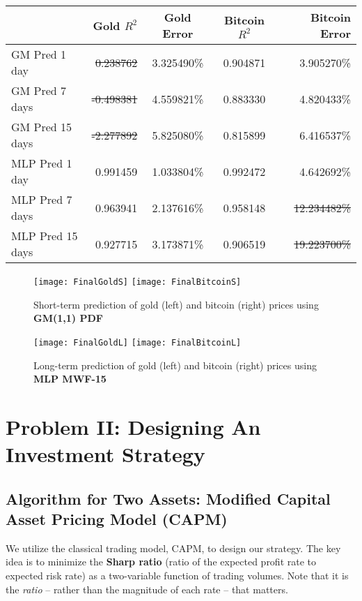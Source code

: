 \documentclass{mcmthesis}
\begin{document}
{	\begin{center}
		\begin{tabular}{l|rccr}
			\toprule
			& Gold $R^2$ & Gold Error & Bitcoin $R^2$ & Bitcoin Error \\ \midrule
			GM Pred 1 day & \sout{0.238762} & 3.325490\% & 0.904871 & 3.905270\% \\
			GM Pred 7 days & \sout{-0.498381} & 4.559821\% & 0.883330 & 4.820433\% \\
			GM Pred 15 days & \sout{-2.277892} & 5.825080\% & 0.815899 & 6.416537\% \\
			MLP Pred 1 day & 0.991459 & 1.033804\% & 0.992472 & 4.642692\% \\
			MLP Pred 7 days & 0.963941 & 2.137616\% & 0.958148 & \sout{12.234482\%} \\
			MLP Pred 15 days & 0.927715 & 3.173871\% & 0.906519 & \sout{19.223700\%} \\
			\bottomrule
		\end{tabular}
	\end{center}
	
	\begin{figure}[h]
		\label {fig:11}
		\centering \texttt{[image: FinalGoldS]}
		\centering \texttt{[image: FinalBitcoinS]}
		\caption{Short-term prediction of gold (left) and bitcoin (right) prices using \textbf{GM(1,1) PDF}}
	\end{figure}
	
	\begin{figure}[h]
		\centering \texttt{[image: FinalGoldL]}
		\centering \texttt{[image: FinalBitcoinL]}
		\caption{Long-term prediction of gold (left) and bitcoin (right) prices using \textbf{MLP MWF-15}}
	\end{figure}
	
	\newpage
	\section{Problem II: Designing An Investment Strategy}
	
	\subsection{Algorithm for Two Assets: Modified Capital Asset Pricing Model (CAPM)}
	\label{sec:4.1}
	
	We utilize the classical trading model, CAPM, to design our strategy. The key idea is to minimize the \textbf{Sharp ratio} (ratio of the expected profit rate to expected risk rate) as a two-variable function of trading volumes. Note that it is the \textit{ratio} -- rather than the magnitude of each rate -- that matters. 
	
}
\end{document}
